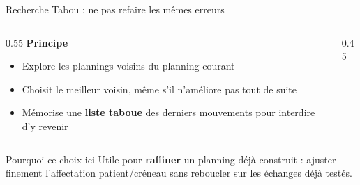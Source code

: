 \begin{frame}{Recherche Tabou : ne pas refaire les mêmes erreurs}
  \begin{columns}
    \begin{column}{0.55\textwidth}
      \textbf{Principe}
      \begin{itemize}
        \item Explore les plannings voisins du planning courant
        \item Choisit le meilleur voisin, même s'il n'améliore pas tout de suite
        \item Mémorise une \textbf{liste taboue} des derniers mouvements pour
        interdire d'y revenir
      \end{itemize}
    \end{column}
    \begin{column}{0.45\textwidth}
      \centering
    \end{column}
  \end{columns}
  \begin{block}{Pourquoi ce choix ici}
    Utile pour \textbf{raffiner} un planning déjà construit : ajuster finement
    l'affectation patient/créneau sans reboucler sur les échanges déjà testés.
  \end{block}
\end{frame}


